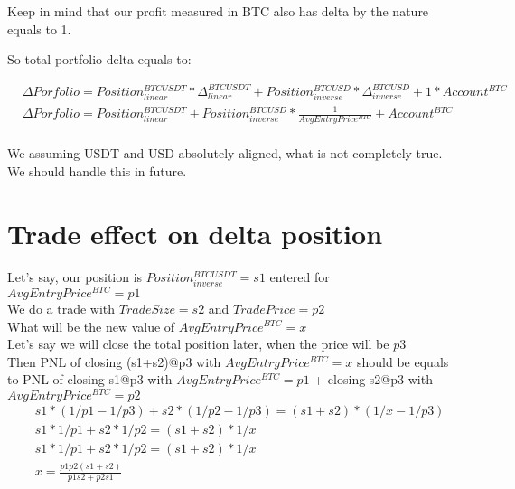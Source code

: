 \documentclass{article}
\begin{document}
Keep in mind that our profit measured in BTC also has delta by the nature equals to 1.

So total portfolio delta equals to:


\begin{align*}
& \Delta Porfolio = Position^{BTCUSDT}_{linear} * \Delta^{BTCUSDT}_{linear} + Position^{BTCUSD}_{inverse} * \Delta^{BTCUSD}_{inverse} + 1 * Account^{BTC} \\
& \Delta Porfolio = Position^{BTCUSDT}_{linear} + Position^{BTCUSD}_{inverse} * \frac{1}{AvgEntryPrice^{BTC}} + Account^{BTC} \\
\end{align*}

\danger We assuming USDT and USD absolutely aligned, what is not completely true. We should handle this in future.





\section{Trade effect on delta position}

Let's say, our position is 
$Position^{BTCUSDT}_{inverse} = s1$ entered for $AvgEntryPrice^{BTC} = p1$ \\

We do a trade with $TradeSize = s2$ and $TradePrice = p2$
\\

What will be the new value of $AvgEntryPrice^{BTC} = x$ \\

Let's say we will close the total position later, when the price will be $p3$ \\

Then PNL of closing (s1+s2)@p3 with $AvgEntryPrice^{BTC} = x$ should be equals to PNL of closing s1@p3 with $AvgEntryPrice^{BTC} = p1$ + closing s2@p3 with $AvgEntryPrice^{BTC} = p2$ \\

\begin{align*}
& s1 * (1/p1 - 1/p3) + s2 * (1/p2 - 1/p3) = (s1+s2) * (1/x - 1/p3) \\
& s1 * 1/p1 + s2 * 1/p2 = (s1+s2) * 1/x \\
& s1 * 1/p1 + s2 * 1/p2 = (s1+s2) * 1/x \\
& x = \frac{p1 p2 (s1 + s2)}{p1 s2 + p2 s1} \\
\end{align*}
\end{document}
